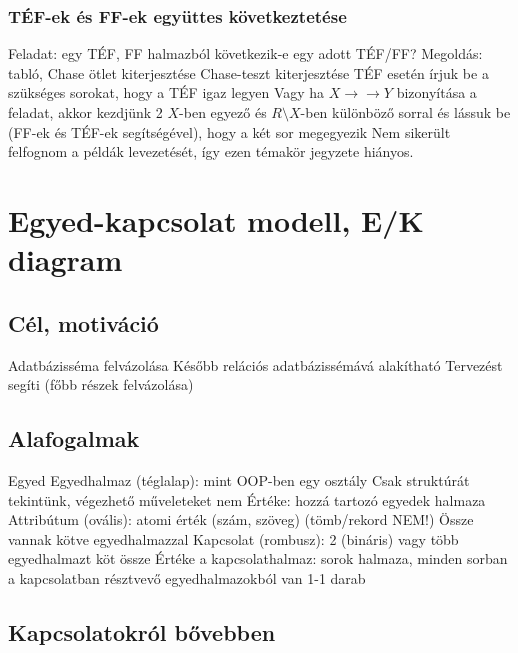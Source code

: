 \documentclass[12pt,a4paper]{article}
\def\tef{\to\to}
\begin{document}
\subsubsection{TÉF-ek és FF-ek együttes következtetése}

\begin{outline}
	\1 Feladat: egy TÉF, FF halmazból következik-e egy adott TÉF/FF?
	\1 Megoldás: tabló, Chase ötlet kiterjesztése
	\1 Chase-teszt kiterjesztése
	\1 TÉF esetén írjuk be a szükséges sorokat, hogy a TÉF igaz legyen
	\1 Vagy ha $X \tef Y$ bizonyítása a feladat, akkor kezdjünk 2 $X$-ben egyező és $R \setminus X$-ben különböző sorral és lássuk be (FF-ek és TÉF-ek segítségével), hogy a két sor megegyezik
	\1 Nem sikerült felfognom a példák levezetését, így ezen témakör jegyzete hiányos.
\end{outline}

\pagebreak

\section{Egyed-kapcsolat modell, E/K diagram}

\subsection{Cél, motiváció}

\begin{outline}
	\1 Adatbázisséma felvázolása
	\1 Később relációs adatbázissémává alakítható
	\1 Tervezést segíti (főbb részek felvázolása)
\end{outline}

\subsection{Alafogalmak}

\begin{outline}
	\1 Egyed
	\1 Egyedhalmaz (téglalap): mint OOP-ben egy osztály
		\2 Csak struktúrát tekintünk, végezhető műveleteket nem
		\2 Értéke: hozzá tartozó egyedek halmaza
	\1 Attribútum (ovális): atomi érték (szám, szöveg) (tömb/rekord NEM!)
		\2 Össze vannak kötve egyedhalmazzal
	\1 Kapcsolat (rombusz): 2 (bináris) vagy több egyedhalmazt köt össze
		\2 Értéke a kapcsolathalmaz: sorok halmaza, minden sorban a kapcsolatban résztvevő egyedhalmazokból van 1-1 darab
\end{outline}

\pagebreak

\subsection{Kapcsolatokról bővebben}
\end{document}
